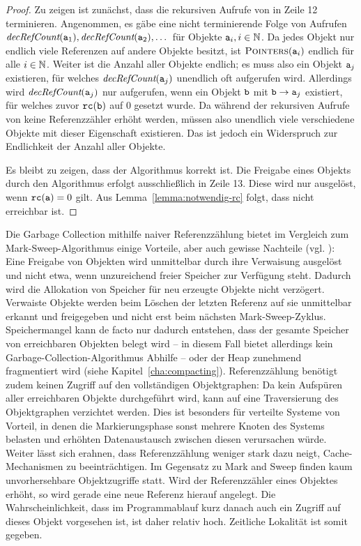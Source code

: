 \begin{proof}
	Zu zeigen ist zunächst, dass die rekursiven Aufrufe von  in Zeile 12 terminieren.
	Angenommen, es gäbe eine nicht terminierende Folge von Aufrufen $\textit{decRefCount}(\texttt{a}_1), \textit{decRefCount}(\texttt{a}_2), \dots$
	für Objekte $\texttt{a}_i, i \in \mathbb{N}$.
	Da jedes Objekt nur endlich viele Referenzen auf andere Objekte besitzt, ist $\textsc{Pointers}(\texttt{a}_i)$ endlich für alle $i \in \mathbb{N}$.
	Weiter ist die Anzahl aller Objekte endlich; es muss also ein Objekt $\texttt{a}_j$ existieren, für welches $\textit{decRefCount}(\texttt{a}_j)$ unendlich oft aufgerufen wird.
	Allerdings wird $\textit{decRefCount}(\texttt{a}_j)$ nur aufgerufen, wenn ein Objekt $\texttt{b}$ mit $\texttt{b} \rightarrow \texttt{a}_j$ existiert, für welches zuvor $\texttt{rc}(\texttt{b})$ auf $0$ gesetzt wurde.
	Da während der rekursiven Aufrufe von  keine Referenzzähler erhöht werden, müssen also unendlich viele verschiedene Objekte  mit dieser Eigenschaft existieren.
	Das ist jedoch ein Widerspruch zur Endlichkeit der Anzahl aller Objekte.
	
	Es bleibt zu zeigen, dass der Algorithmus korrekt ist.
	Die Freigabe eines Objekts  durch den Algorithmus erfolgt ausschließlich in Zeile 13.
	Diese wird nur ausgelöst, wenn $\texttt{rc}(\texttt{a}) = 0$ gilt.
	Aus Lemma~\ref{lemma:notwendig-rc} folgt, dass  nicht erreichbar ist.
\end{proof}

Die Garbage Collection mithilfe naiver Referenzzählung bietet im Vergleich zum Mark-Sweep-Algorithmus einige Vorteile, aber auch gewisse Nachteile (vgl. \cite[S. 346]{linhou2006}):
Eine Freigabe von Objekten wird unmittelbar durch ihre Verwaisung ausgelöst und nicht etwa, wenn unzureichend freier Speicher zur Verfügung steht.
Dadurch wird die Allokation von Speicher für neu erzeugte Objekte nicht verzögert.
Verwaiste Objekte werden beim Löschen der letzten Referenz auf sie unmittelbar erkannt und freigegeben und nicht erst beim nächsten Mark-Sweep-Zyklus.
Speichermangel kann de facto nur dadurch entstehen, dass der gesamte Speicher von erreichbaren Objekten belegt wird -- in diesem Fall bietet allerdings kein Garbage-Collection-Algorithmus Abhilfe -- oder der Heap zunehmend fragmentiert wird (siehe Kapitel~\ref{cha:compacting}).
Referenzzählung benötigt zudem keinen Zugriff auf den vollständigen Objektgraphen:
Da kein Aufspüren aller erreichbaren Objekte durchgeführt wird, kann auf eine Traversierung des Objektgraphen verzichtet werden.
Dies ist besonders für verteilte Systeme von Vorteil, in denen die Markierungsphase sonst mehrere Knoten des Systems belasten und erhöhten Datenaustausch zwischen diesen verursachen würde.
Weiter lässt sich erahnen, dass Referenzzählung weniger stark dazu neigt, Cache-Mechanismen zu beeinträchtigen.
Im Gegensatz zu Mark and Sweep finden kaum unvorhersehbare Objektzugriffe statt.
Wird der Referenzzähler eines Objektes erhöht, so wird gerade eine neue Referenz hierauf angelegt.
Die Wahrscheinlichkeit, dass im Programmablauf kurz danach auch ein Zugriff auf dieses Objekt vorgesehen ist, ist daher relativ hoch.
Zeitliche Lokalität ist somit gegeben.

